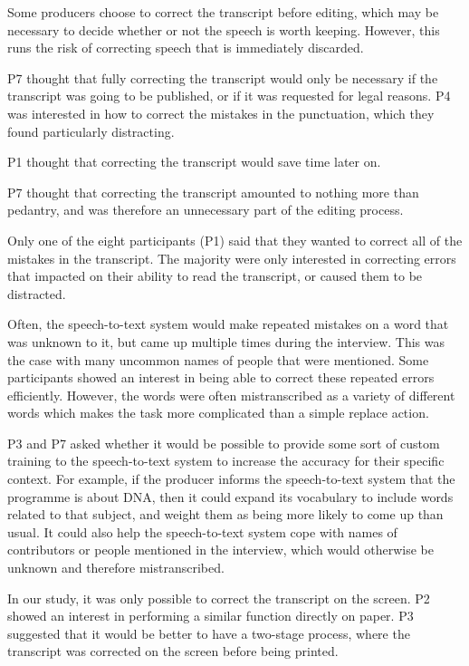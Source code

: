 Some producers choose to correct the transcript before editing, which may be necessary to decide whether or not the
speech is worth keeping. However, this runs the risk of correcting speech that is immediately discarded.

P7 thought that fully correcting the transcript would only be necessary if the transcript was going to be published, or
if it was requested for legal reasons. P4 was interested in how to correct the mistakes in the punctuation, which they
found particularly distracting.

P1 thought that correcting the transcript would save time later on.

P7 thought that correcting the transcript amounted to nothing more than pedantry, and was therefore an unnecessary part
of the editing process.

Only one of the eight participants (P1) said that they wanted to correct all of the mistakes in the transcript. The
majority were only interested in correcting errors that impacted on their ability to read the transcript, or caused
them to be distracted.


Often, the speech-to-text system would make repeated mistakes on a word that was unknown to it,
but came up multiple times during the interview. This was the case with many uncommon names of people that were
mentioned. Some participants showed an interest in being able to correct these repeated errors efficiently. However,
the words were often mistranscribed as a variety of different words which makes the task more complicated than a simple
replace action.


P3 and P7 asked whether it would be possible to provide some sort of custom training to the speech-to-text system to
increase the accuracy for their specific context. For example, if the producer informs the speech-to-text system that
the programme is about DNA, then it could expand its vocabulary to include words related to that subject, and weight
them as being more likely to come up than usual. It could also help the speech-to-text system cope with names of
contributors or people mentioned in the interview, which would otherwise be unknown and therefore mistranscribed.


In our study, it was only possible to correct the transcript on the screen. P2 showed an interest in performing a
similar function directly on paper. P3 suggested that it would be better to have a two-stage process, where the
transcript was corrected on the screen before being printed.

